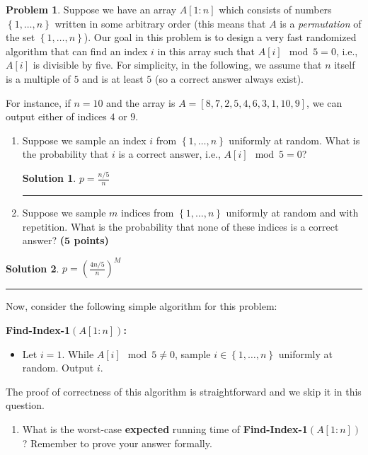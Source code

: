 \documentclass{article}
\theoremstyle{definition}
\newtheorem{problem}{Problem}
\def\fline{\rule{0.75\linewidth}{0.5pt}}
\newcommand{\finishline}{
  \begin{center}\fline
\end{center}}
\newtheorem*{solution*}{Solution}
\newenvironment{solution}{
\begin{solution*}}{{\finishline}
\end{solution*}}
\newcommand{\grade}[1]{\hfill{\textbf{($\mathbf{#1}$ points)}}}
\newcommand{\set}[1]{\ensuremath{\left\{ #1 \right\}}}
\begin{document}
\begin{problem}
Suppose we have an array $A[1:n]$ which consists of numbers $\set{1,\ldots,n}$ written in some arbitrary order (this means that $A$ is a \emph{permutation} of the set $\set{1,\ldots,n}$).
Our goal in this problem is to design a very fast randomized algorithm that can find an index $i$ in this array such that $A[i] \mod 5 = 0$, i.e., $A[i]$ is divisible by five.
For simplicity, in the following, we assume that $n$ itself is a multiple of $5$ and
is at least $5$ (so a correct answer always exist).

For instance, if $n=10$ and the array is $A=[8,7,2,5,4,6,3,1,10,9]$, we can output either of indices $4$ or $9$.

\begin{enumerate}
  \item[(a)]  Suppose we sample an index $i$ from $\set{1,\ldots,n}$ uniformly at random. What is the probability that $i$ is a correct answer, i.e., $A[i] \mod 5 = 0$?

    \begin{solution}
      $p = \frac{n/5}{n}$
    \end{solution}

  \item[(b)] Suppose we sample $m$ indices from $\set{1,\ldots,n}$ uniformly at random and with repetition. What is the probability that none of these indices is a correct answer?  \grade{5}
\end{enumerate}
\begin{solution}
  $p = (\frac{4n/5}{n})^M$
\end{solution}

Now, consider the following simple algorithm for this problem:

\textbf{Find-Index-1$(A[1:n])$:}
\begin{itemize}
  \item Let $i=1$.  While $A[i] \mod 5 \neq 0$, sample $i \in \set{1,\ldots,n}$ uniformly at random. Output $i$.
\end{itemize}

The proof of correctness of this algorithm is straightforward and we skip it in this question.

\begin{enumerate}
  \item[(c)] What is the worst-case \textbf{expected} running time of \textbf{Find-Index-1$(A[1:n])$}? Remember to prove your answer formally.
\end{enumerate}


\end{problem}
\end{document}
